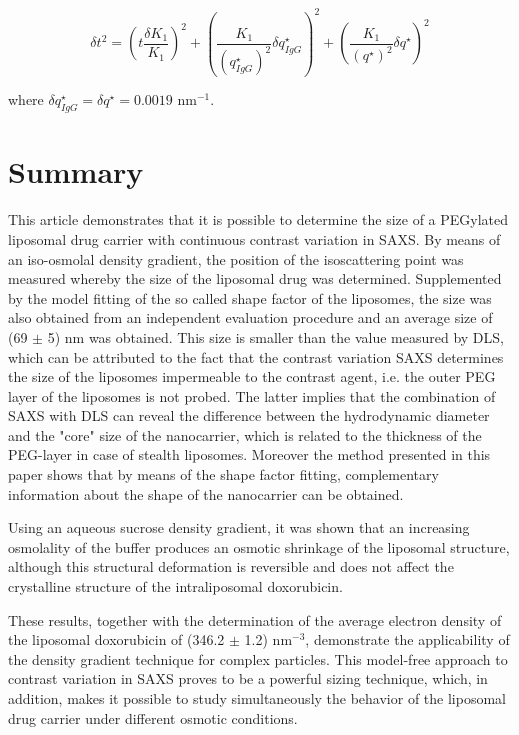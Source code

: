 \begin{equation}
\delta t^2 = \left( t \frac{\delta K_1}{K_1} \right)^2 + \left( \frac{K_1}{\left(q^{\star}_{IgG}\right)^2} \delta q^{\star}_{IgG} \right)^2 + \left( \frac{K_1}{\left(q^{\star}\right)^2} \delta q^{\star}\right)^2
\label{eq:IsopointRadiusDifference}
\end{equation}

where $\delta q^{\star}_{IgG}=\delta q^{\star}=0.0019$ nm$^{-1}$.

\section{Summary}
This article demonstrates that it is possible to determine the size of a PEGylated liposomal drug carrier with continuous contrast variation in SAXS. By means of an iso-osmolal density gradient, the position of the isoscattering point was measured whereby the size of the liposomal drug was determined. Supplemented by the model fitting of the so called shape factor of the liposomes, the size was also obtained from an independent evaluation procedure and an average size of (69 $\pm$ 5) nm was obtained. This size is smaller than the value measured by DLS, which can be attributed to the fact that the contrast variation SAXS determines the size of the liposomes impermeable to the contrast agent, i.e. the outer PEG layer of the liposomes is not probed. The latter implies that the combination of SAXS with DLS can reveal the difference between the hydrodynamic diameter and the "core" size of the nanocarrier, which is related to the thickness of the PEG-layer in case of stealth liposomes. Moreover the method presented in this paper shows that by means of the shape factor fitting, complementary information about the shape of the nanocarrier can be obtained.

Using an aqueous sucrose density gradient, it was shown that an increasing osmolality of the buffer produces an osmotic shrinkage of the liposomal structure, although this structural deformation is reversible and does not affect the crystalline structure of the intraliposomal doxorubicin.

These results, together with the determination of the average electron density of the liposomal doxorubicin of (346.2 $\pm$ 1.2) nm$^{-3}$, demonstrate the applicability of the density gradient technique for complex particles. This model-free approach to contrast variation in SAXS proves to be a powerful sizing technique, which, in addition, makes it possible to study simultaneously the behavior of the liposomal drug carrier under different osmotic conditions.

